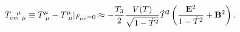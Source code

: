 \begin{equation}
T^{~~\mu}_{em~\mu}\equiv T^\mu_{~\mu} - T^\mu_{~\mu}|_{F_{\mu\nu}=0}\approx 
-\frac{T_3}2\frac{V(T)}{\sqrt{1-\dot{T}^2}}\dot{T}^2
\left( \frac{{\bf E}^2}{1-\dot{T}^2} +  {\bf B}^2 \right).
\label{tmm1}
\end{equation}

